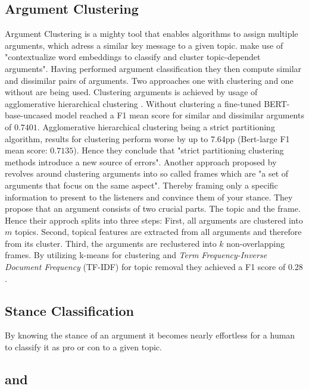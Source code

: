 \subsection{Argument Clustering}
Argument Clustering is a mighty tool that enables algorithms to assign multiple arguments, which adress a similar
key message to a given topic. \citet{reimers2019classification} make use of 
"contextualize word embeddings to classify and cluster topic-dependet arguments". Having performed argument
classification they then compute similar and dissimilar pairs of arguments. Two approaches one with clustering
and one without are being used. 
Clustering arguments is achieved by usage of agglomerative hierarchical clustering \cite{day1984efficient}. 
Without clustering a fine-tuned BERT-base-uncased model reached a F1 mean score for similar and dissimilar
arguments of $0.7401$. 
Agglomerative hierarchical clustering being a strict partitioning algorithm, results for clustering perform
worse by up to 7.64pp (Bert-large F1 mean score: $0.7135$). Hence they conclude that "strict partitioning 
clustering methods introduce a new source of errors".
Another approach proposed by \citet{ajjour2019modeling} revolves around clustering 
arguments into so called frames which are "a set of arguments that focus on the same aspect". 
Thereby framing \cite{entman1993framing} only a specific information to present to the listeners and convince 
them of your stance.
They propose that an argument consists of two crucial parts. The topic and the frame.
Hence their approch splits into three steps: First, all arguments are clustered into $m$ topics. Second,
topical features are extracted from all arguments and therefore from its cluster. Third, the arguments are 
reclustered into $k$ non-overlapping frames. By utilizing k-means \cite{hartigan1979ak} for clustering
and \textit{Term Frequency-Inverse Document Frequency} (TF-IDF) for topic removal they achieved a F1 score of 
$0.28$.


\subsection{Stance Classification}
By knowing the stance of an argument it becomes nearly effortless for a human to classify it as pro or con 
to a given topic. 

\subsection{\Bert and \Roberta}

